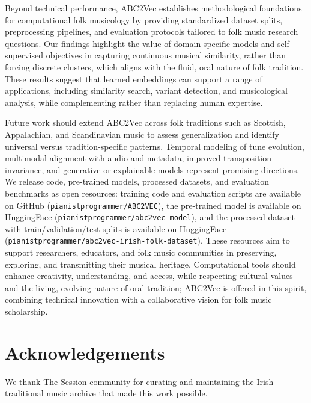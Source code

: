 \documentclass[]{interact}
\theoremstyle{plain}
\theoremstyle{definition}
\theoremstyle{remark}
\begin{document}
Beyond technical performance, ABC2Vec establishes methodological foundations for computational folk musicology by providing standardized dataset splits, preprocessing pipelines, and evaluation protocols tailored to folk music research questions. Our findings highlight the value of domain-specific models and self-supervised objectives in capturing continuous musical similarity, rather than forcing discrete clusters, which aligns with the fluid, oral nature of folk tradition. These results suggest that learned embeddings can support a range of applications, including similarity search, variant detection, and musicological analysis, while complementing rather than replacing human expertise.

Future work should extend ABC2Vec across folk traditions such as Scottish, Appalachian, and Scandinavian music to assess generalization and identify universal versus tradition-specific patterns. Temporal modeling of tune evolution, multimodal alignment with audio and metadata, improved transposition invariance, and generative or explainable models represent promising directions. We release code, pre-trained models, processed datasets, and evaluation benchmarks as open resources: training code and evaluation scripts are available on GitHub (\texttt{pianistprogrammer/ABC2VEC}), the pre-trained model is available on HuggingFace (\texttt{pianistprogrammer/abc2vec-model}), and the processed dataset with train/validation/test splits is available on HuggingFace (\texttt{pianistprogrammer/abc2vec-irish-folk-dataset}). These resources aim to support researchers, educators, and folk music communities in preserving, exploring, and transmitting their musical heritage. Computational tools should enhance creativity, understanding, and access, while respecting cultural values and the living, evolving nature of oral tradition; ABC2Vec is offered in this spirit, combining technical innovation with a collaborative vision for folk music scholarship.

\section*{Acknowledgements}

We thank The Session community for curating and maintaining the Irish traditional music archive that made this work possible.



\end{document}
